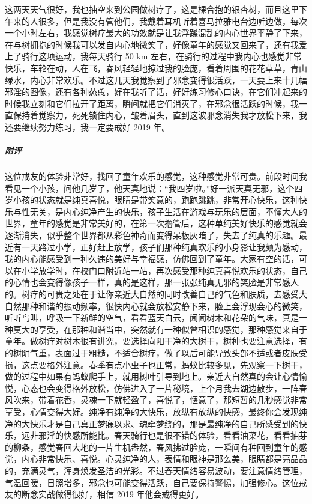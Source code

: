 \begin{case}
    这两天天气很好，我也抽空来到公园做树疗了，这是棵合抱的银杏树，而且这里下午来的人很多，但是我没有管他们，我戴着耳机听着喜马拉雅电台边听边做，每次一个小时左右，我感觉树疗最大的功效就是让我浮躁混乱的内心世界平静了下来，在与树拥抱的时候我可以发自内心地微笑了，好像童年的感觉又回来了，还有我爱上了骑行这项运动，我每天骑行 50 \unit{\km} 左右，在骑行的过程中我内心也感觉非常快乐，车轮在动，人在飞，春风轻轻地掠过我的脸庞，看着周围的花花草草，青山绿水，内心非常欢乐。不过这几天我觉察到了邪念变得很活跃，一天要上来十几幅邪淫的图像，还有各种怂恿，好在我听了话，好好练习修心口诀，在它们冲起来的时候我立刻和它们拉开了距离，瞬间就把它们消灭了，在邪念很活跃的时候，我一直保持着觉察力，死死锁住内心，皱着眉头，直到这波邪念消失我才放松下来，我还要继续努力练习，我一定要戒好 2019 年。
    \subparagraph{附评} 这位戒友的体验非常好，找回了童年欢乐的感觉，这种感觉非常可贵。前段时间我看见一个小孩，问他几岁了，他天真地说：“我四岁啦。”好一派天真无邪，这个四岁小孩的状态就是纯真喜悦，眼睛是带笑意的，跑跑跳跳，非常开心快乐，这种快乐与性无关，是内心纯净产生的快乐，孩子生活在游戏与玩乐的层面，不懂大人的世界，童年的感觉是非常美好的，在第一次撸管后，这种单纯美好快乐的感觉就会逐渐消失，似乎整个世界都从彩色神奇而变得呆板灰暗了，失去了纯真的乐趣。最近有一天路过小学，正好赶上放学，孩子们那种纯真欢乐的小身影让我颇为感动，我的内心能感受到一种久违的美好与幸福感，仿佛回到了童年。大家有空的话，可以在小学放学时，在校门口附近站一站，再次感受那种纯真喜悦欢乐的状态，自己的心情也会变得像孩子一样，真的是这样，那一张张纯真无邪的笑脸是非常感人的。树疗的可贵之处在于让你亲近大自然的同时改善自己的气色和肤质，去感受大自然那种和谐的振动频率，很快内心就会放松安静下来，脸上会浮现会心的微笑，听听鸟叫，呼吸一下新鲜的空气，看看蓝天白云，闻闻树木和花朵的气味，真是一种莫大的享受，在那种和谐当中，突然就有一种似曾相识的感觉，那种感觉来自于童年。做树疗对树木很有讲究，要选择向阳干净的大树干，树种也要注意选择，有的树阴气重，表面过于粗糙，不适合树疗，做了以后可能导致头部不适或者皮肤受损，这点要格外注意。春季有点小虫子也正常，蚂蚁比较多见，先观察一下树干，做的过程中如果有蚂蚁爬手上，就用树叶引导到地上。亲近大自然真的会让心情愉悦，心态也会变得格外放松，仿佛进入了一片秘境，上个月我去湖边散步，一阵春风吹来，带着花香，灵魂一下就轻盈了，喜悦了，惬意了，那短暂的几秒感觉非常享受，心情变得大好。纯净有纯净的大快乐，放纵有放纵的快感，最终你会发现纯净的大快乐才是自己真正梦寐以求、魂牵梦绕的，那是最纯净的自己所感受到的快乐，远非邪淫的快感所能比。春天骑行也是很不错的体验，看看油菜花，看看抽芽的柳条，感觉春回大地的一片生机盎然，春风拂过脸庞，一瞬间有种回到童年的感觉，内心非常快乐、喜悦。心灵纯净的人，表情和眼神是那么美，眼睛都是亮晶晶的，充满灵气，浑身焕发圣洁的光彩。不过春天情绪容易波动，要注意情绪管理，气温回暖，日照增多，邪念也可能变得活跃，自己要保持警惕，加强修心。这位戒友的断念实战做得很好，相信 2019 年他会戒得更好。
\end{case}

